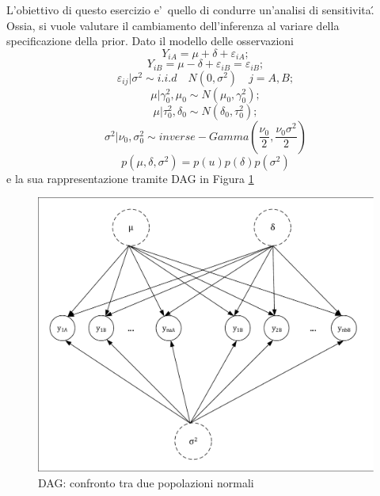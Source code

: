 L'obiettivo di questo esercizio e'\ quello di condurre un'analisi di sensitivita\'. Ossia, si vuole valutare il cambiamento dell'inferenza al variare della specificazione della prior. Dato il modello delle osservazioni 
\[
Y_{iA} = \mu + \delta + \varepsilon_{iA};
\]
\[
Y_{iB} = \mu - \delta + \varepsilon_{iB} = \varepsilon_{iB};
\]
\[
\varepsilon_{ij} | \sigma^2 \sim i.i.d \quad N(0,\sigma^2) \quad j = A,B;
\]
\[
\mu|\gamma_0^2,\mu_0 \sim N(\mu_0,\gamma_0^2);
\]
\[
\mu|\tau_0^2,\delta_0 \sim N(\delta_0,\tau_0^2);
\]
\[
\sigma^2 | \nu_0,\sigma_0^2 \sim inverse-Gamma(\frac{\nu_0}{2},\frac{\nu_0\sigma^2}{2})
\]
\[
p(\mu,\delta,\sigma^2) = p(u)p(\delta)p(\sigma^2)
\]
e la sua rappresentazione tramite DAG in Figura \ref{figure:dag}
\begin{figure}
 \centering
 \includegraphics[scale=0.6]{img/DAG}
 
 \caption{DAG: confronto tra due popolazioni normali}
 \label{figure:dag}
\end{figure}
